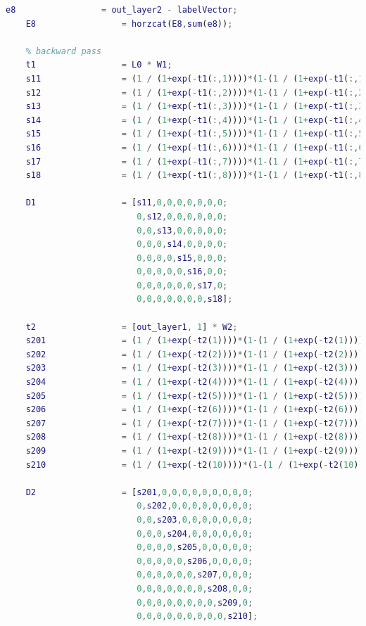 \documentclass[12pt]{article}
\begin{document}
\begin{lstlisting}[language=Matlab]
    e8                 = out_layer2 - labelVector;
    E8                 = horzcat(E8,sum(e8));    
    
    % backward pass
    t1                 = L0 * W1;
    s11                = (1 / (1+exp(-t1(:,1))))*(1-(1 / (1+exp(-t1(:,1)))));
    s12                = (1 / (1+exp(-t1(:,2))))*(1-(1 / (1+exp(-t1(:,2)))));
    s13                = (1 / (1+exp(-t1(:,3))))*(1-(1 / (1+exp(-t1(:,3)))));
    s14                = (1 / (1+exp(-t1(:,4))))*(1-(1 / (1+exp(-t1(:,4)))));
    s15                = (1 / (1+exp(-t1(:,5))))*(1-(1 / (1+exp(-t1(:,5)))));
    s16                = (1 / (1+exp(-t1(:,6))))*(1-(1 / (1+exp(-t1(:,6)))));
    s17                = (1 / (1+exp(-t1(:,7))))*(1-(1 / (1+exp(-t1(:,7)))));
    s18                = (1 / (1+exp(-t1(:,8))))*(1-(1 / (1+exp(-t1(:,8)))));
       
    D1                 = [s11,0,0,0,0,0,0,0;
                          0,s12,0,0,0,0,0,0;
                          0,0,s13,0,0,0,0,0;
                          0,0,0,s14,0,0,0,0;
                          0,0,0,0,s15,0,0,0;
                          0,0,0,0,0,s16,0,0;
                          0,0,0,0,0,0,s17,0;
                          0,0,0,0,0,0,0,s18];
    
    t2                 = [out_layer1, 1] * W2;
    s201               = (1 / (1+exp(-t2(1))))*(1-(1 / (1+exp(-t2(1)))));
    s202               = (1 / (1+exp(-t2(2))))*(1-(1 / (1+exp(-t2(2)))));
    s203               = (1 / (1+exp(-t2(3))))*(1-(1 / (1+exp(-t2(3)))));
    s204               = (1 / (1+exp(-t2(4))))*(1-(1 / (1+exp(-t2(4)))));
    s205               = (1 / (1+exp(-t2(5))))*(1-(1 / (1+exp(-t2(5)))));
    s206               = (1 / (1+exp(-t2(6))))*(1-(1 / (1+exp(-t2(6)))));
    s207               = (1 / (1+exp(-t2(7))))*(1-(1 / (1+exp(-t2(7)))));
    s208               = (1 / (1+exp(-t2(8))))*(1-(1 / (1+exp(-t2(8)))));
    s209               = (1 / (1+exp(-t2(9))))*(1-(1 / (1+exp(-t2(9)))));
    s210               = (1 / (1+exp(-t2(10))))*(1-(1 / (1+exp(-t2(10)))));
    
    D2                 = [s201,0,0,0,0,0,0,0,0,0;
                          0,s202,0,0,0,0,0,0,0,0;
                          0,0,s203,0,0,0,0,0,0,0;
                          0,0,0,s204,0,0,0,0,0,0;
                          0,0,0,0,s205,0,0,0,0,0;
                          0,0,0,0,0,s206,0,0,0,0;
                          0,0,0,0,0,0,s207,0,0,0;
                          0,0,0,0,0,0,0,s208,0,0;
                          0,0,0,0,0,0,0,0,s209,0;
                          0,0,0,0,0,0,0,0,0,s210];
    

\end{lstlisting}
\end{document}
